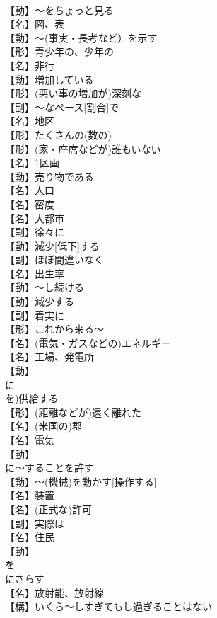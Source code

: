 \documentclass[8pt]{extreport}
\begin{document}
\begin{CJK}{UTF8}{min}
\\	【動】～をちょっと見る
\\	【名】図、表
\\	【動】～(事実・長考など）を示す
\\	【形】青少年の、少年の
\\	【名】非行
\\	【動】増加している
\\	【形】(悪い事の増加が)深刻な
\\	【副】～なペース[割合]で
\\	【名】地区
\\	【形】たくさんの(数の)
\\	【形】(家・座席などが)誰もいない
\\	【名】1区画
\\	【動】売り物である
\\	【名】人口
\\	【名】密度
\\	【名】大都市
\\	【副】徐々に
\\	【動】減少[低下]する
\\	【副】ほぼ間違いなく
\\	【名】出生率
\\	【動】～し続ける
\\	【動】減少する
\\	【副】着実に
\\	【形】これから来る～
\\	【名】(電気・ガスなどの)エネルギー
\\	【名】工場、発電所
\\	【動】
\\	に
\\	を)供給する
\\	【形】(距離などが)遠く離れた
\\	【名】(米国の)郡
\\	【名】電気
\\	【動】
\\	に～することを許す
\\	【動】～(機械)を動かす[操作する]
\\	【名】装置
\\	【名】(正式な)許可
\\	【副】実際は
\\	【名】住民
\\	【動】
\\	を
\\	にさらす
\\	【名】放射能、放射線
\\	【構】いくら～しすぎてもし過ぎることはない

\end{CJK}
\end{document}
